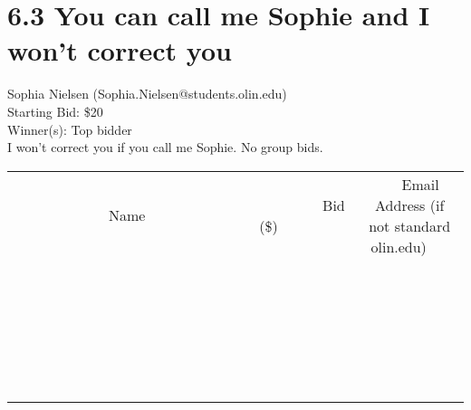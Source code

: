 \documentclass[11pt]{article}
\begin{document}
					\section*{6.3 You can call me Sophie and I won't correct you}
					Sophia Nielsen (Sophia.Nielsen@students.olin.edu) \\
					Starting Bid: \$20 \\
					Winner(s): Top bidder \\
					I won't correct you if you call me Sophie. No group bids. \\
					[6ex]
					\begin{tabular}{c c c}
						~~~~~~~~~~~~~Name~~~~~~~~~~~~~ & ~~~~~~~~~Bid (\$)~~~~~~~~~ & ~~~Email Address (if not standard olin.edu)~~~ \\
				
 & & \\
\hline
 & & \\
\hline
 & & \\
\hline
 & & \\
\hline
 & & \\
\hline
 & & \\
\hline
 & & \\
\hline
 & & \\
\hline
 & & \\
\hline
 & & \\
\hline
 & & \\
\hline
 & & \\
\hline
 & & \\
\hline
 & & \\
\hline
 & & \\
\hline
 & & \\
\hline
 & & \\
\hline
 & & \\
\hline
 & & \\
\hline
 & & \\
\hline
 & & \\
\hline
 & & \\
\hline
 & & \\
\hline
 & & \\
\hline
 & & \\
\hline
 & & \\
\hline
					\end{tabular}
					\clearpage
				
\end{document}

